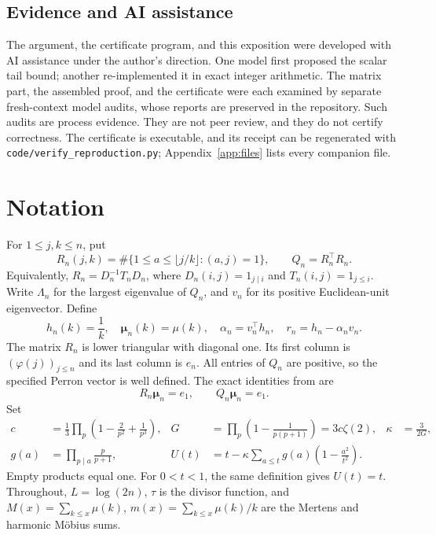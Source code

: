 \documentclass[11pt]{article}
\theoremstyle{remark}\newtheorem{remark}[theorem]{Remark}
\newcommand{\muvec}{\boldsymbol\mu}
\begin{document}
\subsection*{Evidence and AI assistance}
The argument, the certificate program, and this exposition were developed with AI assistance under the author's direction. One model first proposed the scalar tail bound; another re-implemented it in exact integer arithmetic. The matrix part, the assembled proof, and the certificate were each examined by separate fresh-context model audits, whose reports are preserved in the repository. Such audits are process evidence. They are not peer review, and they do not certify correctness. The certificate is executable, and its receipt can be regenerated with \texttt{code/verify\_reproduction.py}; Appendix~\ref{app:files} lists every companion file.

\section{Notation}
For $1\le j,k\le n$, put
\[
 R_n(j,k)=\#\{1\le a\le \lfloor j/k\rfloor:(a,j)=1\},
 \qquad Q_n=R_n^\top R_n.
\]
Equivalently, $R_n=D_n^{-1}T_nD_n$, where $D_n(i,j)=1_{j\mid i}$ and $T_n(i,j)=1_{j\le i}$. Write $\Lambda_n$ for the largest eigenvalue of $Q_n$, and $v_n$ for its positive Euclidean-unit eigenvector. Define
\[
 h_n(k)=\frac1k,\quad \muvec_n(k)=\mu(k),\quad
 \alpha_n=v_n^\top h_n,\quad r_n=h_n-\alpha_nv_n.
\]
The matrix $R_n$ is lower triangular with diagonal one. Its first column is $(\varphi(j))_{j\le n}$ and its last column is $e_n$. All entries of $Q_n$ are positive, so the specified Perron vector is well defined. The exact identities from \cite{kline} are
\begin{equation}\label{eq:original}
 R_n\muvec_n=e_1,\qquad Q_n\muvec_n=e_1.
\end{equation}
Set
\begin{align*}
 c&=\frac13\prod_p\left(1-\frac2{p^2}+\frac1{p^3}\right),&
 G&=\prod_p\left(1-\frac1{p(p+1)}\right)=3c\zeta(2),&
 \kappa&=\frac3{2G},\\
 g(a)&=\prod_{p\mid a}\frac p{p+1},&
 U(t)&=t-\kappa\sum_{a\le t}g(a)\left(1-\frac{a^2}{t^2}\right).&&
\end{align*}
Empty products equal one. For $0<t<1$, the same definition gives $U(t)=t$. Throughout, $L=\log(2n)$, $\tau$ is the divisor function, and $M(x)=\sum_{k\le x}\mu(k)$, $m(x)=\sum_{k\le x}\mu(k)/k$ are the Mertens and harmonic M\"obius sums.
\end{document}
